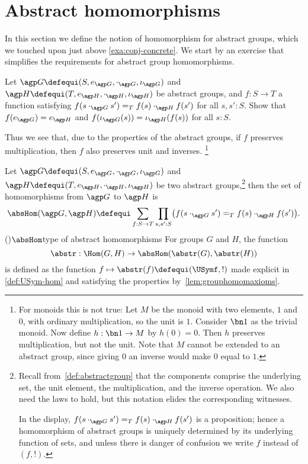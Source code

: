 \section{Abstract homomorphisms}\label{sec:abshom}

In this section we define the notion of homomorphism for
abstract groups, which we touched upon just above
\cref{exa:conj-concrete}. We start by an exercise
that simplifies the requirements for abstract group homomorphisms.

\begin{xca}\label{{xca:onlymult-hom}}
  Let $\agp G\defequi(S,e_{\agp G},\cdot_{\agp G},\iota_{\agp G})$
  and $\agp H\defequi(T,e_{\agp H},\cdot_{\agp H},\iota_{\agp H})$
  be abstract groups, and $f:S\to T$ a function satisfying
  $f(s\cdot_{\agp G}s')=_Tf(s)\cdot_{\agp H}f(s')$ for all $s,s':S$.
  Show that $f(e_{\agp G}) = e_{\agp H}$ and 
  $f(\iota_{\agp G}(s)) = \iota_{\agp H}(f(s))$ for all $s:S$.
\end{xca}

Thus we see that, due to the properties of the abstract groups,
if $f$ preserves multiplication, then $f$ also preserves unit and inverses.%
\footnote{\label{ft:monoid-hom}For monoids this is not true:
  Let $M$ be the monoid with two elements, $1$ and $0$,
  with ordinary multiplication, so the unit is $1$. 
  Consider $\bn1$ as the trivial monoid.
  Now define $h: \bn1\to M$ by $h(0)=0$. Then $h$ preserves
  multiplication, but not the unit. Note that $M$ cannot
  be extended to an abstract group, since giving $0$
  an inverse would make $0$ equal to $1$.}
  
\begin{definition}\label{def:abstrisfunctor}
  Let $\agp G\defequi(S,e_{\agp G},\cdot_{\agp G},\iota_{\agp G})$
  and $\agp H\defequi(T,e_{\agp H},\cdot_{\agp H},\iota_{\agp H})$
  be two abstract groups,\footnote{%
    Recall from~\cref{def:abstractgroup} that the components comprise
    the underlying set, the unit element, the multiplication,
    and the inverse operation. We also need the laws to hold, 
    but this notation elides the corresponding witnesses.

    In the display, 
    $f(s\cdot_{\agp G}s')=_Tf(s)\cdot_{\agp H}f(s')$ is a proposition; 
    hence a homomorphism of abstract groups is uniquely determined
    by its underlying function of sets, and unless there is danger of
    confusion we write $f$ instead of $(f,!)$.}
  then the set of homomorphisms from $\agp G$ to $\agp H$ is
  \[
    \absHom(\agp G,\agp H)
    \defequi\sum_{f:S\to T}
    \prod_{s,s':S}\bigl(f(s\cdot_{\agp G}s')=_Tf(s)\cdot_{\agp H}f(s')\bigr).
  \]
  \glossary(){$\protect\absHom$}{type of abstract homomorphisms}
  For groups $G$ and $H$, the function
  \[
    \abstr:\Hom(G,H)\to\absHom(\abstr(G),\abstr(H))
  \]
  is defined as the function $f\mapsto \abstr(f)\defequi(\USymf,!)$
  made explicit in \cref{def:USym-hom} and satisfying the
  properties by~\cref{lem:grouphomomaxioms}.
\end{definition}

